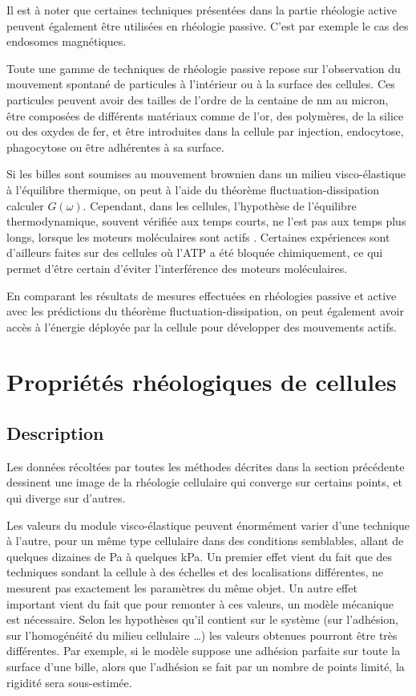Il est à noter que certaines techniques présentées dans la partie rhéologie active peuvent également être utilisées en rhéologie passive. C'est par exemple le cas des endosomes magnétiques. 

Toute une gamme de techniques de rhéologie passive repose sur l'observation du mouvement spontané de particules à l'intérieur ou à la surface des cellules. Ces particules peuvent avoir des tailles de l'ordre de la centaine de nm au micron, être composées de différents matériaux comme de l'or, des polymères, de la silice ou des oxydes de fer, et être introduites dans la cellule par injection, endocytose, phagocytose ou être adhérentes à sa surface. 

Si les billes sont soumises au mouvement brownien dans un milieu visco-élastique à l'équilibre thermique, on peut à l'aide du théorème fluctuation-dissipation calculer $G(\omega)$. 
Cependant, dans les cellules, l'hypothèse de l'équilibre thermodynamique, souvent vérifiée aux temps courts, ne l'est pas aux temps plus longs, lorsque les moteurs moléculaires sont actifs \parencite{mizuno_nonequilibrium_2007}. 
Certaines expériences sont d'ailleurs faites sur des cellules où l'ATP a été bloquée chimiquement, ce qui permet d'être certain d'éviter l'interférence des moteurs moléculaires. 

En comparant les résultats de mesures effectuées en rhéologies passive et active avec les prédictions du théorème fluctuation-dissipation, on peut également avoir accès à l'énergie déployée par la cellule pour développer des mouvements actifs. 



\section{Propriétés rhéologiques de cellules}

\subsection{Description}

Les données récoltées par toutes les méthodes décrites dans la section précédente dessinent une image de la rhéologie cellulaire qui converge sur certains points, et qui diverge sur d'autres. 

Les valeurs du module visco-élastique peuvent énormément varier d'une technique à l'autre, pour un même type cellulaire dans des conditions semblables, allant de quelques dizaines de Pa à quelques kPa. 
Un premier effet vient du fait que des techniques sondant la cellule à des échelles et des localisations différentes, ne mesurent pas exactement les paramètres du même objet. 
Un autre effet important vient du fait que pour remonter à ces valeurs, un modèle mécanique est nécessaire. Selon les hypothèses qu'il contient sur le système (sur l'adhésion, sur l'homogénéité du milieu cellulaire \dots) les valeurs obtenues pourront être très différentes. 
Par exemple, si le modèle suppose une adhésion parfaite sur toute la surface d'une bille, alors que l'adhésion se fait par un nombre de points limité, la rigidité sera sous-estimée. 

